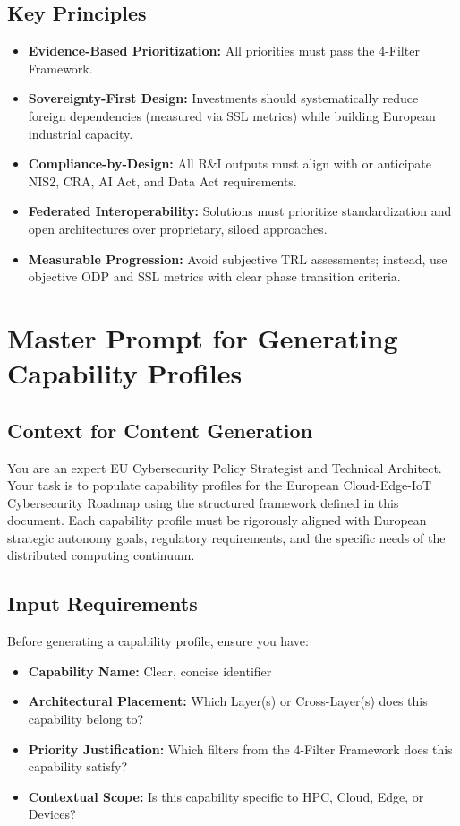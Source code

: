 \documentclass[12pt,a4paper]{report}
\begin{document}
\subsection*{Key Principles}
\begin{itemize}
    \item \textbf{Evidence-Based Prioritization:} All priorities must pass the 4-Filter Framework.
    \item \textbf{Sovereignty-First Design:} Investments should systematically reduce foreign dependencies (measured via SSL metrics) while building European industrial capacity.
    \item \textbf{Compliance-by-Design:} All R\&I outputs must align with or anticipate NIS2, CRA, AI Act, and Data Act requirements.
    \item \textbf{Federated Interoperability:} Solutions must prioritize standardization and open architectures over proprietary, siloed approaches.
    \item \textbf{Measurable Progression:} Avoid subjective TRL assessments; instead, use objective ODP and SSL metrics with clear phase transition criteria.
\end{itemize}

\newpage
\section{Master Prompt for Generating Capability Profiles}

\subsection*{Context for Content Generation}
You are an expert EU Cybersecurity Policy Strategist and Technical Architect. Your task is to populate capability profiles for the European Cloud-Edge-IoT Cybersecurity Roadmap using the structured framework defined in this document. Each capability profile must be rigorously aligned with European strategic autonomy goals, regulatory requirements, and the specific needs of the distributed computing continuum.

\subsection*{Input Requirements}
Before generating a capability profile, ensure you have:
\begin{itemize}
    \item \textbf{Capability Name:} Clear, concise identifier
    \item \textbf{Architectural Placement:} Which Layer(s) or Cross-Layer(s) does this capability belong to?
    \item \textbf{Priority Justification:} Which filters from the 4-Filter Framework does this capability satisfy?
    \item \textbf{Contextual Scope:} Is this capability specific to HPC, Cloud, Edge, or Devices?
\end{itemize}
\end{document}
